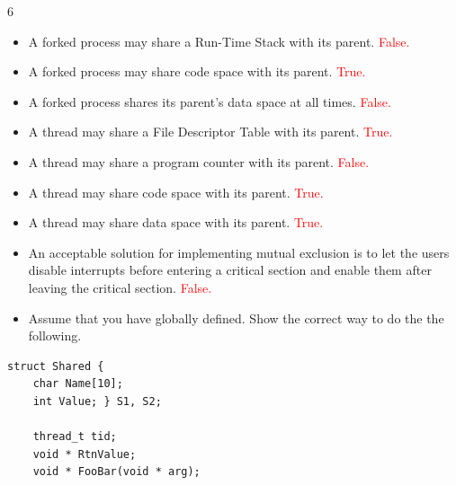 \documentclass[9pt,landscape]{memoir}
\newcommand{\answer}[1]{\textcolor{red}{#1}}
\begin{document}
\raggedright
\footnotesize
\begin{multicols}{6}

\setlength{\premulticols}{1pt}
\setlength{\postmulticols}{1pt}
\setlength{\multicolsep}{1pt}
\setlength{\columnsep}{2pt}
\tiny

\begin{itemize}
    \item A forked process may share a Run-Time Stack with its parent. \answer{False.}
    \item A forked process may share code space with its parent. \answer{True.}
    \item A forked process shares its parent's data space at all times. \answer{False.}
    \item A thread may share a File Descriptor Table with its parent. \answer{True.}
    \item A thread may share a program counter with its parent. \answer{False.}
    \item A thread may share code space with its parent. \answer{True.}
    \item A thread may share data space with its parent. \answer{True.}
    \item An acceptable solution for implementing mutual exclusion is to let the users disable interrupts before entering a critical section and enable them after leaving the critical section. \answer{False.}
    \item Assume that you have globally defined. Show the correct way to do the the following.
\end{itemize}
\begin{lstlisting}[style=cC++,aboveskip=1pt,belowskip=1pt]
    struct Shared {
    char Name[10];
    int Value; } S1, S2;

    thread_t tid;
    void * RtnValue;
    void * FooBar(void * arg);
\end{lstlisting}


\end{multicols}
\end{document}
